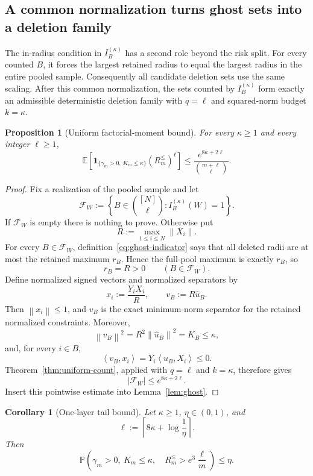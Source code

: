 \documentclass[11pt]{article}
\newtheorem{proposition}[theorem]{Proposition}
\newtheorem{corollary}[theorem]{Corollary}
\theoremstyle{definition}
\theoremstyle{remark}
\newcommand{\E}{\mathbb E}
\newcommand{\Pp}{\mathbb P}
\newcommand{\one}{\mathbf 1}
\newcommand{\ip}[2]{\left\langle #1,#2\right\rangle}
\newcommand{\norm}[1]{\left\lVert #1\right\rVert}
\begin{document}
\subsection{A common normalization turns ghost sets into a deletion family}

The in-radius condition in \(I_B^{(\kappa)}\) has a second role beyond the
risk split. For every counted \(B\), it forces the largest retained radius to
equal the largest radius in the entire pooled sample. Consequently all
candidate deletion sets use the same scaling. After this common
normalization, the sets counted by \(I_B^{(\kappa)}\) form exactly an
admissible deterministic deletion family with \(q=\ell\) and squared-norm
budget \(k=\kappa\).

\begin{proposition}[Uniform factorial-moment bound]
\label{prop:moment}
For every \(\kappa\ge1\) and every integer \(\ell\ge1\),
\[
 \boxed{
 \E\left[
   \one_{\{\gamma_m>0,\ K_m\le \kappa\}}
   (R_m^{\le})^\ell
 \right]
 \le
 \frac{e^{8\kappa+2\ell}}{\binom{m+\ell}{\ell}}.}
 \tag{4.4}
\]
\end{proposition}

\begin{proof}
Fix a realization of the pooled sample and let
\[
 \mathcal F_W
 :=
 \left\{
 B\in\binom{[N]}\ell:
 I_B^{(\kappa)}(W)=1
 \right\}.
\]
If \(\mathcal F_W\) is empty there is nothing to prove. Otherwise put
\[
 R:=\max_{1\le i\le N}\norm{X_i}.
\]
For every \(B\in\mathcal F_W\), definition~\eqref{eq:ghost-indicator} says that all deleted
radii are at most the retained maximum \(r_B\). Hence the full-pool maximum is
exactly \(r_B\), so
\[
 r_B=R>0
 \qquad(B\in\mathcal F_W).
\]
Define normalized signed vectors and normalized separators by
\[
 x_i:=\frac{Y_iX_i}{R},
 \qquad
 v_B:=R\widehat u_B.
\]
Then \(\norm{x_i}\le1\), and \(v_B\) is the exact minimum-norm separator for
the retained normalized constraints. Moreover,
\[
 \norm{v_B}^2
 =
 R^2\norm{\widehat u_B}^2
 =
 \widehat K_B
 \le \kappa,
\]
and, for every \(i\in B\),
\[
 \ip{v_B}{x_i}
 =
 Y_i\ip{\widehat u_B}{X_i}
 \le0.
\]
Theorem~\ref{thm:uniform-count}, applied with \(q=\ell\) and
\(k=\kappa\), therefore gives
\[
 |\mathcal F_W|\le e^{8\kappa+2\ell}.
\]
Insert this pointwise estimate into Lemma~\ref{lem:ghost}.
\end{proof}

\begin{corollary}[One-layer tail bound]
\label{cor:layer}
Let \(\kappa\ge1\), \(\eta\in(0,1)\), and
\[
 \ell:=
 \left\lceil8\kappa+\log\frac1\eta\right\rceil.
\]
Then
\[
 \boxed{
 \Pp\left(
   \gamma_m>0,\ K_m\le \kappa,\quad
   R_m^{\le}>e^3\frac\ell m
 \right)
 \le\eta.}
 \tag{4.5}
\]
\end{corollary}
\end{document}
